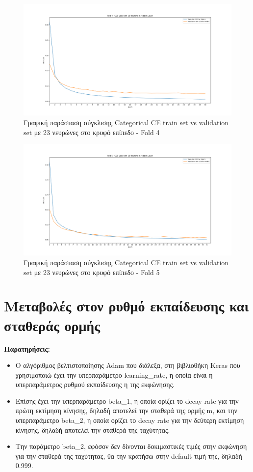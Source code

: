 \documentclass[12pt,a4paper]{article}
\begin{document}
\begin{figure}[H]
	\includegraphics[width=\textwidth]{22. Train vs Validation Fold 4.png}
	\caption{Γραφική παράσταση σύγκλισης Categorical CE train set vs validation set με 23 νευρώνες στο κρυφό επίπεδο - Fold 4}
\end{figure}

\begin{figure}[H]
	\includegraphics[width=\textwidth]{23. Train vs Validation Fold 5.png}
	\caption{Γραφική παράσταση σύγκλισης Categorical CE train set vs validation set με 23 νευρώνες στο κρυφό επίπεδο - Fold 5}
\end{figure}

\section{Μεταβολές στον ρυθμό εκπαίδευσης και σταθεράς ορμής}

\textbf{Παρατηρήσεις:}
\begin{itemize}
    \item Ο αλγόριθμος βελτιστοποίησης Adam που διάλεξα, στη βιβλιοθήκη Keras που χρησιμοποιώ έχει την υπερπαράμετρο learning\_rate, η οποία είναι η υπερπαράμετρος ρυθμού εκπαίδευσης η της εκφώνησης. 
    \item Επίσης έχει την υπερπαράμετρο beta\_1, η οποία ορίζει το decay rate για την πρώτη εκτίμηση κίνησης, δηλαδή αποτελεί την σταθερά της ορμής m, και την υπερπαράμετρο beta\_2, η οποία ορίζει το decay rate για την δεύτερη εκτίμηση κίνησης, δηλαδή αποτελεί την σταθερά της ταχύτητας. 
    \item Την παράμετρο beta\_2, εφόσον δεν δίνονται δοκιμαστικές τιμές στην εκφώνηση για την σταθερά της ταχύτητας, θα την κρατήσω στην default τιμή της, δηλαδή 0.999.
\end{itemize}
\end{document}
